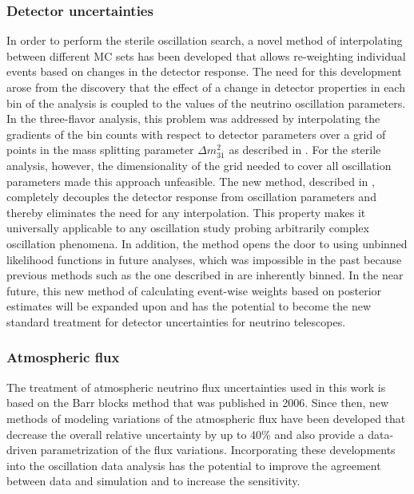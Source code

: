 \subsubsection{Detector uncertainties}
In order to perform the sterile oscillation search, a novel method of interpolating between different MC sets has been developed that allows re-weighting individual events based on changes in the detector response. The need for this development arose from the discovery that the effect of a change in detector properties in each bin of the analysis is coupled to the values of the neutrino oscillation parameters. In the three-flavor analysis, this problem was addressed by interpolating the gradients of the bin counts with respect to detector parameters over a grid of points in the mass splitting parameter $\Delta m^2_{31}$ as described in . For the sterile analysis, however, the dimensionality of the grid needed to cover all oscillation parameters made this approach unfeasible. The new method, described in , completely decouples the detector response from oscillation parameters and thereby eliminates the need for any interpolation. This property makes it universally applicable to any oscillation study probing arbitrarily complex oscillation phenomena. In addition, the method opens the door to using unbinned likelihood functions in future analyses, which was impossible in the past because previous methods such as the one described in  are inherently binned. In the near future, this new method of calculating event-wise weights based on posterior estimates will be expanded upon and has the potential to become the new standard treatment for detector uncertainties for neutrino telescopes.

\subsubsection{Atmospheric flux}
The treatment of atmospheric neutrino flux uncertainties used in this work is based on the Barr blocks method that was published in 2006\cite{Barr2006}. Since then, new methods of modeling variations of the atmospheric flux have been developed that decrease the overall relative uncertainty by up to 40\% and also provide a data-driven parametrization of the flux variations. Incorporating these developments into the oscillation data analysis has the potential to improve the agreement between data and simulation and to increase the sensitivity.

